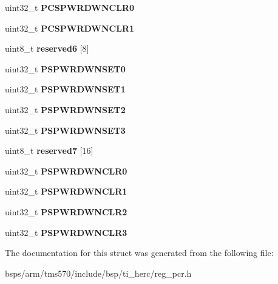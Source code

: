 \begin{DoxyCompactItemize}
uint32\+\_\+t {\bfseries P\+C\+S\+P\+W\+R\+D\+W\+N\+C\+L\+R0}
\item 
\mbox{\label{structtms570__pcr__t_a40a1483c01275959f5b65a80364c5f38}} 
uint32\+\_\+t {\bfseries P\+C\+S\+P\+W\+R\+D\+W\+N\+C\+L\+R1}
\item 
\mbox{\label{structtms570__pcr__t_a86854a00b7140402aa51f9d19e9db4c0}} 
uint8\+\_\+t {\bfseries reserved6} \mbox{[}8\mbox{]}
\item 
\mbox{\label{structtms570__pcr__t_a2dd28ed7efa4dacb320bef7268553521}} 
uint32\+\_\+t {\bfseries P\+S\+P\+W\+R\+D\+W\+N\+S\+E\+T0}
\item 
\mbox{\label{structtms570__pcr__t_ad6746bd159a09127adfed334cbbb6f54}} 
uint32\+\_\+t {\bfseries P\+S\+P\+W\+R\+D\+W\+N\+S\+E\+T1}
\item 
\mbox{\label{structtms570__pcr__t_ae9a78be1cd361ef23f5351f1daa19d1d}} 
uint32\+\_\+t {\bfseries P\+S\+P\+W\+R\+D\+W\+N\+S\+E\+T2}
\item 
\mbox{\label{structtms570__pcr__t_a946891a1037a344ffefc5b8958abc1fc}} 
uint32\+\_\+t {\bfseries P\+S\+P\+W\+R\+D\+W\+N\+S\+E\+T3}
\item 
\mbox{\label{structtms570__pcr__t_ab538e61bcb61be5b3bde7efebba834ca}} 
uint8\+\_\+t {\bfseries reserved7} \mbox{[}16\mbox{]}
\item 
\mbox{\label{structtms570__pcr__t_a6426b202c7c2d1e876f2b81014c33cf6}} 
uint32\+\_\+t {\bfseries P\+S\+P\+W\+R\+D\+W\+N\+C\+L\+R0}
\item 
\mbox{\label{structtms570__pcr__t_a08985a5f1b102fb184c6d49520d37125}} 
uint32\+\_\+t {\bfseries P\+S\+P\+W\+R\+D\+W\+N\+C\+L\+R1}
\item 
\mbox{\label{structtms570__pcr__t_a5f1cc2c4a098c4190d3277852ac49aa3}} 
uint32\+\_\+t {\bfseries P\+S\+P\+W\+R\+D\+W\+N\+C\+L\+R2}
\item 
\mbox{\label{structtms570__pcr__t_a9085c1d3d5ffe4248c95eac574664cbd}} 
uint32\+\_\+t {\bfseries P\+S\+P\+W\+R\+D\+W\+N\+C\+L\+R3}
\end{DoxyCompactItemize}


The documentation for this struct was generated from the following file\+:\begin{DoxyCompactItemize}
\item 
bsps/arm/tms570/include/bsp/ti\+\_\+herc/reg\+\_\+pcr.\+h\end{DoxyCompactItemize}
